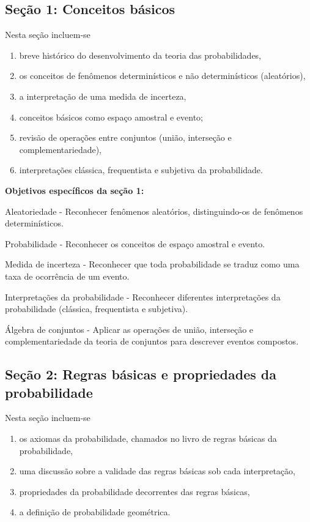 \begin{apresentacao}
\columnbreak
\subsection{Seção 1: Conceitos básicos}
Nesta seção incluem-se
\begin{enumerate}
\item breve histórico do desenvolvimento da teoria das probabilidades,
\item os conceitos de fenômenos determinísticos e não determinísticos (aleatórios),
\item a interpretação de uma medida de incerteza,
\item conceitos básicos como espaço amostral e evento;
\item revisão de operações entre conjuntos (união, interseção e complementariedade),
\item interpretações clássica, frequentista e subjetiva da probabilidade.
\end{enumerate}

\textbf{Objetivos específicos da seção 1:}
\begin{OES}
\item Aleatoriedade - Reconhecer fenômenos aleatórios, distinguindo-os de fenômenos determinísticos.
\item Probabilidade - Reconhecer os conceitos de espaço amostral e evento.
\item Medida de incerteza - Reconhecer que toda probabilidade se traduz como uma taxa de ocorrência de um evento.
\item Interpretações da probabilidade - Reconhecer diferentes interpretações da probabilidade (clássica, frequentista e subjetiva).
\item Álgebra de conjuntos - Aplicar as operações de união, interseção e complementariedade da teoria de conjuntos para descrever eventos compostos.
\end{OES}

\subsection{Seção 2: Regras básicas e propriedades da probabilidade}

Nesta seção incluem-se
\begin{enumerate}
\item os axiomas da probabilidade, chamados no livro de regras básicas da probabilidade,
\item uma discussão sobre a validade das regras básicas sob cada interpretação,
\item propriedades da probabilidade decorrentes das regras básicas,
\item a definição de probabilidade geométrica.
\end{enumerate}


\end{apresentacao}
